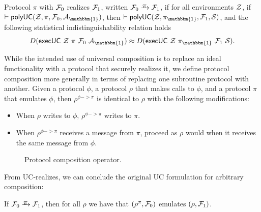 \begin{definition}[UC-realizes]
  Protocol $\pi$ with $\mathcal{{F}}_0$ realizes $\mathcal{{F}}_1$, written $\mc{F}_0
  \yrightarrow{$\pi$} \mc{F}_1$, if for all environments $\mathcal{{Z}}$, if $|-
  \keyword{polyUC}(\mc{Z}, \pi, \mc{F}_0, \mc{A}_{\mathbbm{1}})$, then
  $|- \keyword{polyUC}(\mc{Z}, \pi_{\mathbbm{1}}, \mc{F}_1, \mc{S})$, and the
  following statistical indistinguishability relation holds
  \[ D(\mathsf{execUC}\ \mc{Z}\ \pi\ \mc{F}_0\ \mc{A}_{\mathbbm{1}}) \approx D(\mathsf{execUC}\ \mc{Z}\ \pi_{\mathbbm{1}}\ \mc{F}_1\ \mc{S}).\]
\end{definition}

  While the intended use of universal composition is to replace an
ideal functionality with a protocol that securely realizes it, we define
protocol composition  more generally in terms of
replacing one subroutine protocol with another. Given a protocol $\phi$, a protocol
$\rho$ that makes calls to $\phi$,  and a protocol $\pi$ that emulates $\phi$, then $\rho^{\phi -> \pi}$ is identical to
$\rho$ with the following modifications:
\begin{itemize}[leftmargin=*]
  \item When $\rho$ writes to $\phi$, $\rho^{\phi -> \pi}$ writes to $\pi$.
  \item When $\rho^{\phi -> \pi}$ receives a message from $\pi$, proceed as $\rho$ would when
    it receives the same message from $\phi$.
\end{itemize}

\begin{figure}

\caption{Protocol composition operator.}
\label{fig:composition-operator}
\end{figure}

From UC-realizes, we can conclude the original UC formulation for arbitrary
composition:
\begin{theorem}
  If $\mc{F}_0 \yrightarrow{$\pi$} \mc{F}_1$, then for all $\rho$ we
  have that $(\rho^{\pi}, \mathcal{{F}}_0)$ emulates $(\rho, \mathcal{{F}}_1)$.
\end{theorem}

